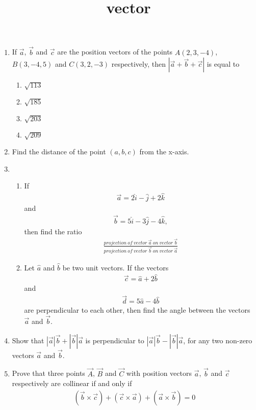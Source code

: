 \documentclass{article}
\title{vector}
\begin{document}
\begin{enumerate}
	\item If $\vec{a}$, $\vec{b}$ and $\vec{c}$ are the position vectors of the points $A(2,3,-4)$, $B(3,-4,5)$ and $C(3,2,-3)$ respectively, then $|\vec{a} + \vec{b} + \vec{c}|$ is equal to
\begin{enumerate}[label=(\Alph*)]
\item $\sqrt{113}$
\item $\sqrt{185}$
\item $\sqrt{203}$
\item $\sqrt{209}$
\end{enumerate}
\item Find the distance of the point $(a, b, c)$ from the x-axis.
\item \begin{enumerate} %
		\item If 
			\begin{align}
				\vec{a}= 2\hat{i} - \hat{j} + 2\hat{k}
			\end{align}
			and
			\begin{align}
				\vec{b} = 5\hat{i} - 3\hat{j} - 4\hat{k},
			\end{align}
			then find the ratio
			\begin{align}
				\frac{projection\:of\:vector\:\vec{a}\:on\:vector \:\vec{b}}{projection\:of\:vector\:\vec{b}\:on\:vector\:\vec{a}}
			\end{align}
\item Let $\hat{a}$ and $\hat{b}$ be two unit vectors. If the vectors 
	\begin{align}	
		\vec{c} = \hat{a} + 2\hat{b}
	\end{align}
		and 
		\begin{align}
			\vec{d} = 5\hat{a} - 4\hat{b} 
		\end{align}
		are perpendicular to each other, then find the angle between the vectors $\vec{a}$ and $\vec{b}.$ 
\end{enumerate}
\item Show that $|\vec{a}|\vec{b} +|\vec{b}|\vec{a}$ is perpendicular to $|\vec{a} |\vec{b} - |\vec{b}|\vec{a}$, for any two non-zero vectors $\vec{a}$ and $\vec{b}.$
\item Prove that three points $\vec{A}$, $\vec{B}$ and $\vec{C}$ with position vectors $\vec{a}$, $\vec{b}$ and $\vec{c}$ respectively are collinear if and only if 
	\begin{align}
		(\vec{b} \times \vec{c}) + (\vec{c} \times \vec{a}) + (\vec{a} \times \vec{b}) = 0
	\end{align}
\end{enumerate}
\end{document}
